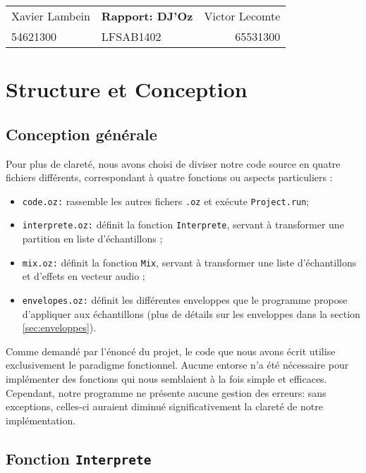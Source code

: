 \documentclass[a4paper,12pt]{article}
\begin{document}
\begin{center}
\begin{tabu} to \textwidth {lX[c]r}
    Xavier Lambein & \large{\textbf{Rapport: DJ'Oz}} & Victor Lecomte \\
    54621300 & LFSAB1402 & 65531300 \\
    \hline
\end{tabu}
\end{center}

\section{Structure et Conception}
\label{sec:struct}

\subsection{Conception générale}

Pour plus de clareté, nous avons choisi de diviser notre code source en quatre fichiers différents, correspondant à quatre fonctions ou aspects particuliers :
\begin{itemize}
    \item \texttt{code.oz:} rassemble les autres fichers \texttt{.oz} et exécute \texttt{Project.run};
    \item \texttt{interprete.oz:} définit la fonction \texttt{Interprete}, servant à transformer une partition en liste d'échantillons ;
    \item \texttt{mix.oz:} définit la fonction \texttt{Mix}, servant à transformer une liste d'échantillons et d'effets en vecteur audio ;
    \item \texttt{envelopes.oz:} définit les différentes enveloppes que le programme propose d'appliquer aux échantillons (plus de détails sur les enveloppes dans la section \ref{sec:enveloppes}).
\end{itemize}

Comme demandé par l'énoncé du projet, le code que nous avons écrit utilise exclusivement le paradigme fonctionnel. Aucune entorse n'a été nécessaire pour implémenter des fonctions qui nous semblaient à la fois simple et efficaces. Cependant, notre programme ne présente aucune gestion des erreurs: sans exceptions, celles-ci auraient diminué significativement la clareté de notre implémentation.

\subsection{Fonction \texttt{Interprete}}
\end{document}

